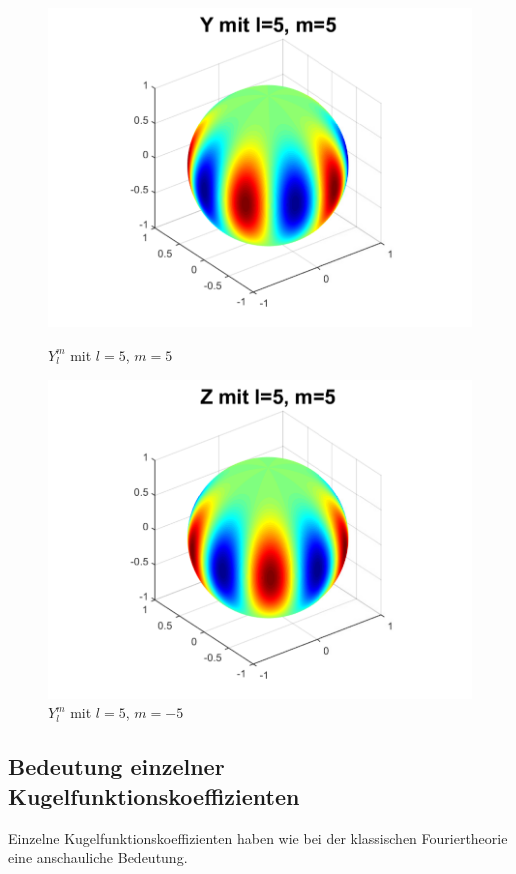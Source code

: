 \begin{figure}
\begin{minipage}[hbt]{0.4\textwidth}
\includegraphics[width=1\textwidth]{chapters/images/ylm/a_5_5.pdf}
\caption{$Y^m_l$ mit $l=5$, $m=5$}
\label{skript:ylm l=5 m=5}
\end{minipage}
\hfill
\begin{minipage}[hbt]{0.4\textwidth}
\centering
\includegraphics[width=1\textwidth]{chapters/images/ylm/b_5_5.pdf}
\caption{$Y^m_l$ mit $l=5$, $m=-5$}
\label{skript:zlm l=5 m=5}
\end{minipage}
\end{figure}

\subsection{Bedeutung einzelner Kugelfunktionskoeffizienten}
Einzelne Kugelfunktionskoeffizienten haben wie bei der klassischen
Fouriertheorie eine anschauliche Bedeutung.

